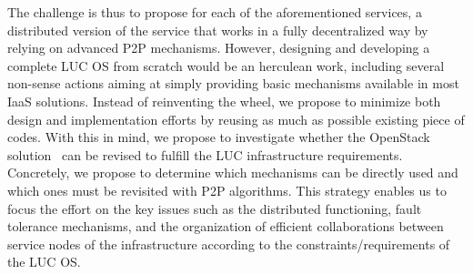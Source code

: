 

The challenge is thus to propose for each of the aforementioned services, a
distributed version of the service that works in a fully decentralized way by
relying on advanced P2P mechanisms. However, designing and developing a complete
LUC OS from scratch would be an herculean work, including several non-sense
actions aiming at simply providing basic mechanisms available in most IaaS
solutions. Instead of reinventing the wheel, we propose to minimize both design
and implementation efforts by reusing as much as possible existing piece of
codes. With this in mind, we propose to investigate whether the OpenStack
solution~\cite{openstack} can be revised to fulfill the LUC infrastructure
requirements. Concretely, we propose to determine which mechanisms can be
directly used and which ones must be revisited with P2P algorithms. This
strategy enables us to focus the effort on the key issues such as the
distributed functioning, fault tolerance mechanisms, and the organization of
efficient collaborations between service nodes of the infrastructure according
to the constraints/requirements of the LUC OS.





